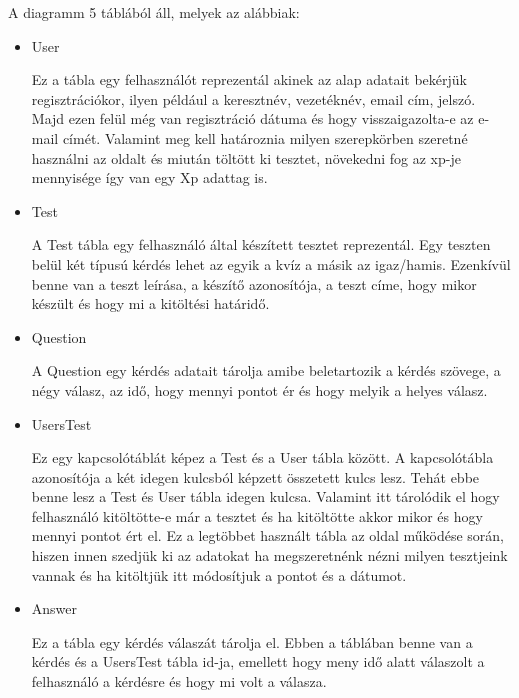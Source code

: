 A diagramm 5 táblából áll, melyek az alábbiak:
\begin{itemize}
    \item {User}
          \begin{addmargin}[\parindent]{0pt}
              Ez a tábla egy felhasználót reprezentál akinek az alap adatait bekérjük regisztrációkor, ilyen például a keresztnév, vezetéknév, email cím, jelszó. Majd ezen felül még van regisztráció dátuma és hogy visszaigazolta-e az e-mail címét. Valamint meg kell határoznia milyen szerepkörben szeretné használni az oldalt és miután töltött ki tesztet, növekedni fog az xp-je mennyisége így van egy Xp adattag is.
          \end{addmargin}

    \item {Test}
          \begin{addmargin}[\parindent]{0pt}
              A Test tábla egy felhasználó által készített tesztet reprezentál. Egy teszten belül két típusú kérdés lehet az egyik a kvíz a másik az igaz/hamis. Ezenkívül benne van a teszt leírása, a készítő azonosítója, a teszt címe, hogy mikor készült és hogy mi a kitöltési határidő.
          \end{addmargin}

    \item {Question}
          \begin{addmargin}[\parindent]{0pt}
              A Question egy kérdés adatait tárolja amibe beletartozik a kérdés szövege, a négy válasz, az idő, hogy mennyi pontot ér és hogy melyik a helyes válasz.
          \end{addmargin}


    \item {UsersTest}
          \begin{addmargin}[\parindent]{0pt}
              Ez egy kapcsolótáblát képez a Test és a User tábla között. A kapcsolótábla azonosítója a két idegen kulcsból képzett összetett kulcs lesz. Tehát ebbe benne lesz a Test és User tábla idegen kulcsa. Valamint itt tárolódik el hogy felhasználó kitöltötte-e már a tesztet és ha kitöltötte akkor mikor és hogy mennyi pontot ért el. Ez a legtöbbet használt tábla az oldal működése során, hiszen innen szedjük ki az adatokat ha megszeretnénk nézni milyen tesztjeink vannak és ha kitöltjük itt módosítjuk a pontot és a dátumot.
          \end{addmargin}

    \item {Answer}
          \begin{addmargin}[\parindent]{0pt}
              Ez a tábla egy kérdés válaszát tárolja el. Ebben a táblában benne van a kérdés és a UsersTest tábla id-ja, emellett hogy meny idő alatt válaszolt a felhasználó a kérdésre és hogy mi volt a válasza.
          \end{addmargin}

\end{itemize}

